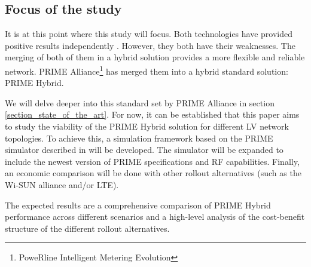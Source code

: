 \subsection{Focus of the study}\label{section_introduction_subsection_focus_of_the_study}
It is at this point where this study will focus. Both technologies have provided positive results independently \cite{prime_hybrid_solution_combines_plc_and_rf}. However, they both have their weaknesses. The merging of both of them in a hybrid solution provides a more flexible and reliable network. PRIME Alliance\footnote{PoweRline Intelligent Metering Evolution} has merged them into a hybrid standard solution: PRIME Hybrid.

We will delve deeper into this standard set by PRIME Alliance in section \ref{section_state_of_the_art}. For now, it can be established that this paper aims to study the viability of the PRIME Hybrid solution for different LV network topologies. To achieve this, a simulation framework based on the PRIME simulator described in \cite{tesis_jmatanza} will be developed. The simulator will be expanded to include the newest version of PRIME specifications and RF capabilities. Finally, an economic comparison will be done with other rollout alternatives (such as the Wi-SUN alliance and/or LTE).

The expected results are a comprehensive comparison of PRIME Hybrid performance across different scenarios and a high-level analysis of the cost-benefit structure of the different rollout alternatives.